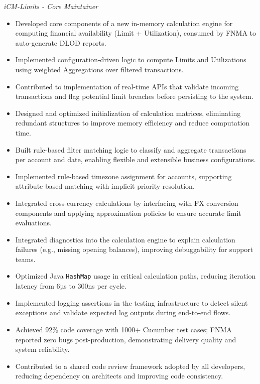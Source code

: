 \documentclass[a4paper,10pt]{article}
\newcommand{\cvHeaderThree}[1]{%
  \noindent\textit{#1}%
}
\newenvironment{cvItemList}{%
  \begin{itemize}%
    \setlength{\itemsep}{0.1em}%
    \setlength{\topsep}{0em}%
    \setlength{\partopsep}{0em}%
    \setlength{\parsep}{0em}%
    \setlength{\parskip}{0em}%
}{%
  \end{itemize}%
}
\begin{document}
\cvHeaderThree{iCM-Limits - Core Maintainer}
\begin{cvItemList}
  \item Developed core components of a new in-memory calculation engine for computing financial availability (Limit + Utilization), consumed by FNMA to auto-generate DLOD reports.
  \item Implemented configuration-driven logic to compute Limits and Utilizations using weighted Aggregations over filtered transactions.
  \item Contributed to implementation of real-time APIs that validate incoming transactions and flag potential limit breaches before persisting to the system.
  \item Designed and optimized initialization of calculation matrices, eliminating redundant structures to improve memory efficiency and reduce computation time.
  \item Built rule-based filter matching logic to classify and aggregate transactions per account and date, enabling flexible and extensible business configurations.
  \item Implemented rule-based timezone assignment for accounts, supporting attribute-based matching with implicit priority resolution.
  \item Integrated cross-currency calculations by interfacing with FX conversion components and applying approximation policies to ensure accurate limit evaluations.
  \item Integrated diagnostics into the calculation engine to explain calculation failures (e.g., missing opening balances), improving debuggability for support teams.
  \item Optimized Java \texttt{HashMap} usage in critical calculation paths, reducing iteration latency from 6µs to 300ns per cycle.
  \item Implemented logging assertions in the testing infrastructure to detect silent exceptions and validate expected log outputs during end-to-end flows.
  \item Achieved 92\% code coverage with 1000+ Cucumber test cases; FNMA reported zero bugs post-production, demonstrating delivery quality and system reliability.
  \item Contributed to a shared code review framework adopted by all developers, reducing dependency on architects and improving code consistency.
\end{cvItemList}

\newpage
\end{document}
